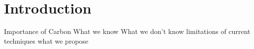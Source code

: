 \section{Introduction} 
Importance of Carbon
What we know
What we don't know
limitations of current techniques
what we propose
